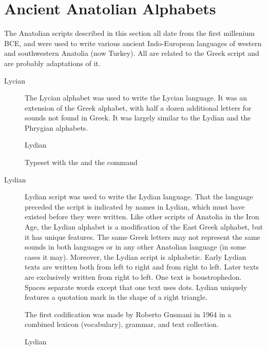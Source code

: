 \section{Ancient Anatolian Alphabets}

The Anatolian scripts described in this section all date from the first millenium BCE, and were used to write various ancient Indo-European languages of western and southwestern Anatolia (now Turkey). All are related to the Greek script and are probably adaptations of it. 

\newfontfamily{}
\let\lydian\lycian
\let\carian\lydian

\begin{description}
\item [Lycian] The Lycian alphabet was used to write the Lycian language. It was an extension of the Greek alphabet, with half a dozen additional letters for sounds not found in Greek. It was largely similar to the Lydian and the Phrygian alphabets.
 
\begin{scriptexample}[]{Lydian}

Typeset with the  and the command \cmd{\lycian}
\end{scriptexample}

\item[Lydian] Lydian script was used to write the Lydian language. That the language preceded the script is indicated by names in Lydian, which must have existed before they were written. Like other scripts of Anatolia in the Iron Age, the Lydian alphabet is a modification of the East Greek alphabet, but it has unique features. The same Greek letters may not represent the same sounds in both languages or in any other Anatolian language (in some cases it may). Moreover, the Lydian script is alphabetic.
Early Lydian texts are written both from left to right and from right to left. Later texts are exclusively written from right to left. One text is boustrophedon. Spaces separate words except that one text uses dots. Lydian uniquely features a quotation mark in the shape of a right triangle.

The first codification was made by Roberto Gusmani in 1964 in a combined lexicon (vocabulary), grammar, and text collection.

\begin{scriptexample}[]{Lydian}

\medskip


\end{scriptexample}
\end{description}
